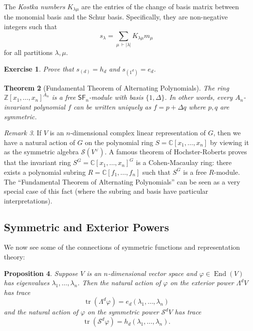 \documentclass[12pt]{article}
\theoremstyle{plain}
\newtheorem{theorem}{Theorem}[section]
\newtheorem{proposition}[theorem]{Proposition}
\newtheorem{exercise}[theorem]{Exercise}
\theoremstyle{definition}
\theoremstyle{remark}
\newtheorem{remark}[theorem]{Remark}
\numberwithin{equation}{section}
\begin{document}
The \emph{Kostka numbers} $K_{\lambda \mu}$ are the entries of the
change of basis matrix between the monomial basis and the Schur basis.
Specifically, they are non-negative integers such that
\[
s_\lambda = \sum_{\mu\, \vdash |\lambda|} K_{\lambda \mu} m_\mu
\]
for all partitions $\lambda,\mu$.

\begin{exercise}
Prove that $s_{(d)} = h_d$ and $s_{(1^d)} = e_d$.
\end{exercise}

\begin{theorem}[Fundamental Theorem of Alternating Polynomials]
The ring $\mathbb{Z}[x_1,\ldots,x_n]^{A_n}$ is a free
$\mathsf{SF}_n$-module with basis $\{1, \Delta\}$.
In other words, every $A_n$-invariant polynomial $f$ can be written uniquely
as $f=p+\Delta q$ where $p,q$ are symmetric.
\end{theorem}

\begin{remark}
If $V$ is an $n$-dimensional complex linear representation of $G$,
then we have a natural action of $G$ on the polynomial ring
$S=\mathbb{C}[x_1,\ldots,x_n]$ by viewing it as the symmetric algebra
$\mathcal{S}(V^\vee)$.
A famous theorem of Hochster-Roberts proves that the invariant ring
$S^G=\mathbb{C}[x_1,\ldots,x_n]^G$ is a Cohen-Macaulay ring:
there exists a polynomial subring $R=\mathbb{C}[f_1,\ldots,f_n]$
such that $S^G$ is a free $R$-module.
The ``Fundamental Theorem of Alternating Polynomials'' can be seen as a
very special case of this fact (where the subring and basis have
particular interpretations).
\end{remark}

\subsection{Symmetric and Exterior Powers}

We now see some of the connections of symmetric functions and
representation theory:

\begin{proposition}
Suppose $V$ is an $n$-dimensional vector space and
$\varphi \in \operatorname{End}(V)$ has eigenvalues
$\lambda_1,\ldots,\lambda_n$.
Then the natural action of $\varphi$ on the exterior power $\Lambda^d V$
has trace
\[
\operatorname{tr}\left( \Lambda^d \varphi \right)
= e_d(\lambda_1,\ldots,\lambda_n)
\]
and the natural action of $\varphi$ on the symmetric power
$\mathcal{S}^d V$ has trace
\[
\operatorname{tr}\left( \mathcal{S}^d \varphi \right)
= h_d(\lambda_1,\ldots,\lambda_n).
\]
\end{proposition}
\end{document}
